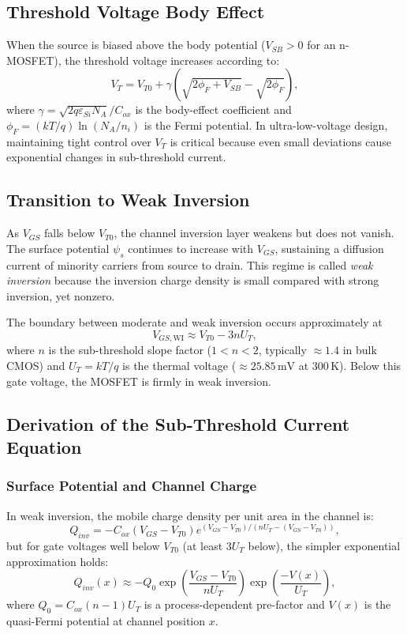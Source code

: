 \subsection{Threshold Voltage Body Effect}

When the source is biased above the body potential ($V_{SB} > 0$ for an n-MOSFET), the
threshold voltage increases according to:
\[
  V_T = V_{T0} + \gamma \left( \sqrt{2\phi_F + V_{SB}} - \sqrt{2\phi_F} \right),
\]
where $\gamma = \sqrt{2 q \varepsilon_{Si} N_A} / C_{ox}$ is the body-effect coefficient and
$\phi_F = (kT/q) \ln(N_A / n_i)$ is the Fermi potential.  In ultra-low-voltage design,
maintaining tight control over $V_T$ is critical because even small deviations cause
exponential changes in sub-threshold current.

\subsection{Transition to Weak Inversion}

As $V_{GS}$ falls below $V_{T0}$, the channel inversion layer weakens but does not vanish.
The surface potential $\psi_s$ continues to increase with $V_{GS}$, sustaining a diffusion
current of minority carriers from source to drain.  This regime is called \emph{weak
inversion} because the inversion charge density is small compared with strong inversion, yet
nonzero.

The boundary between moderate and weak inversion occurs approximately at
\[
  V_{GS,\text{WI}} \approx V_{T0} - 3 n U_T,
\]
where $n$ is the sub-threshold slope factor ($1 < n < 2$, typically $\approx 1.4$ in
bulk CMOS) and $U_T = kT/q$ is the thermal voltage ($\approx 25.85\,\text{mV}$ at
$300\,\text{K}$).  Below this gate voltage, the MOSFET is firmly in weak inversion.

\subsection{Derivation of the Sub-Threshold Current Equation}

\subsubsection{Surface Potential and Channel Charge}

In weak inversion, the mobile charge density per unit area in the channel is:
\[
  Q_{inv} = -C_{ox} (V_{GS} - V_{T0}) e^{(V_{GS}-V_{T0})/(n U_T - (V_{GS}-V_{T0}))},
\]
but for gate voltages well below $V_{T0}$ (at least $3 U_T$ below), the simpler
exponential approximation holds:
\[
  Q_{inv}(x) \approx -Q_0 \exp\!\left(\frac{V_{GS} - V_{T0}}{n U_T}\right)
                      \exp\!\left(\frac{-V(x)}{U_T}\right),
\]
where $Q_0 = C_{ox} (n-1) U_T$ is a process-dependent pre-factor and $V(x)$ is the
quasi-Fermi potential at channel position $x$.

